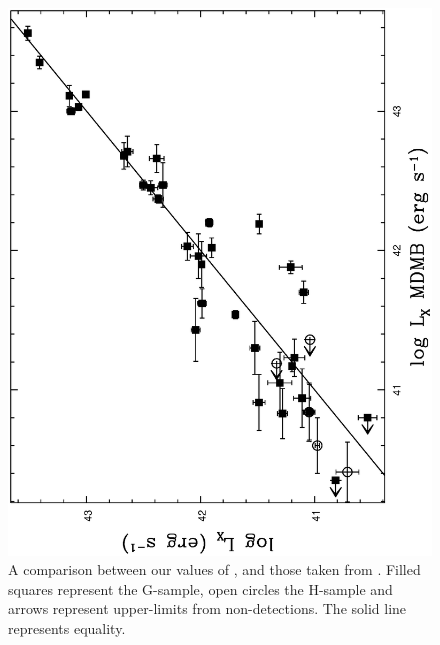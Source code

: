 \documentclass[usenatbib]{mn2e}
\begin{document}
\begin{figure}
\begin{minipage}{241pt}
    \includegraphics[height=\linewidth,angle=270]{fig_08.ps}
    \caption{A comparison between our values of \LX, and those taken from
             \citet{mulchaey03}.  Filled squares represent the G-sample, open
             circles the H-sample and arrows represent upper-limits from
             non-detections.  The solid line represents equality.}
    \label{fig_LX_LXMDMB}

  \end{minipage}\hspace{18pt}
  \begin{minipage}{241pt}


\end{minipage}
\end{figure}
\end{document}
